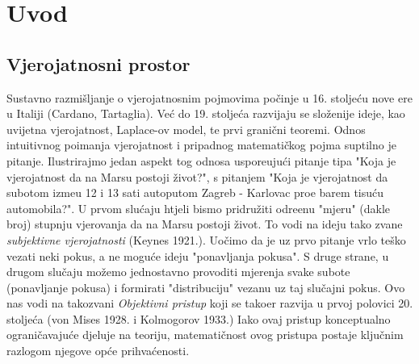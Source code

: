 
\part{Uvod}

\chapter{Vjerojatnosni prostor}

Sustavno razmi\v sljanje o vjerojatnosnim pojmovima po\v cinje u 16.
stolje\' cu nove ere u Italiji (Cardano, Tartaglia). Ve\' c do 19.
stolje\' ca razvijaju se slo\v zenije ideje, kao uvijetna vjerojatnost,
Laplace-ov model, te prvi grani\v cni teoremi. Odnos intuitivnog
poimanja vjerojatnost i pripadnog matemati\v ckog pojma suptilno
je pitanje. Ilustrirajmo jedan aspekt tog odnosa uspore\dj uju\' ci
pitanje tipa "Koja je vjerojatnost da na Marsu postoji \v zivot?",
s pitanjem "Koja je vjerojatnost da subotom izme\dj u 12 i 13 sati
autoputom Zagreb - Karlovac pro\dj e barem tisu\' cu automobila?".
U prvom slu\' caju htjeli bismo pridru\v ziti odre\dj enu "mjeru"
(dakle broj) stupnju vjerovanja da na Marsu postoji \v zivot.
To vodi na ideju tako zvane \emph{subjektivne vjerojatnosti}
(Keynes 1921.). Uo\v cimo da je uz prvo pitanje vrlo te\v sko
vezati neki pokus, a ne mogu\' ce ideju "ponavljanja pokusa".
S druge strane, u drugom slu\v caju mo\v zemo jednostavno provoditi
mjerenja svake subote (ponavljanje pokusa) i formirati "distribuciju"
vezanu uz taj slu\v cajni pokus. Ovo nas vodi na takozvani
\emph{Objektivni pristup} koji se tako\dj er razvija u prvoj polovici
20. stolje\' ca (von Mises 1928. i Kolmogorov 1933.) Iako ovaj
pristup konceptualno ograni\v cavaju\' ce djeluje na teoriju,
matemati\v cnost ovog pristupa postaje klju\v cnim razlogom njegove
op\' ce prihva\' cenosti.